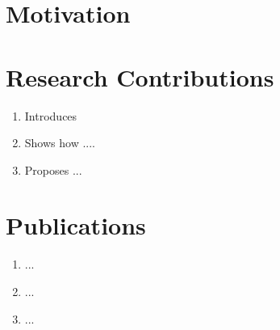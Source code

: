 

\section{Motivation}


\section{Research Contributions}


\begin{enumerate}

    \item Introduces
    \item Shows how ....
    \item Proposes ...

\end{enumerate}



\section{Publications}

\begin{enumerate}
    \item ...

    \item ...

    \item ...

\end{enumerate}
\cleardoublepage
